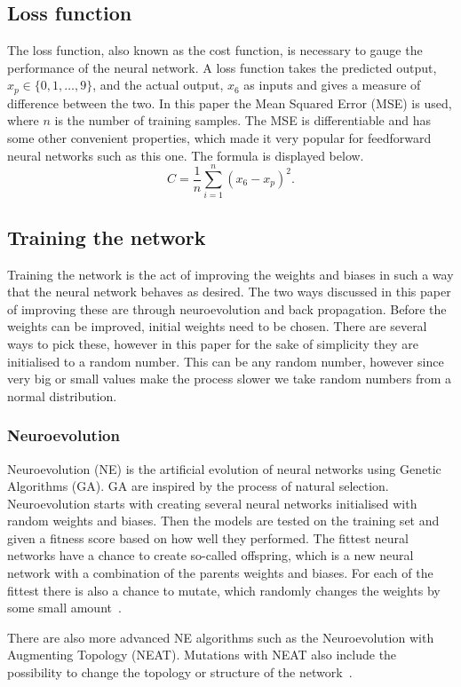 \subsection{Loss function}\label{s:loss}
The loss function, also known as the cost function, is necessary to gauge the performance of the neural network.
A loss function takes the predicted output, \(x_p\in \{0, 1, \ldots, 9\} \), and the actual output, \(x_6\) as inputs and gives a measure of difference between the two.
In this paper the Mean Squared Error (MSE) is used, where \(n\) is the number of training samples.
The MSE is differentiable and has some other convenient properties, which made it very popular for feedforward neural networks such as this one.
The formula is displayed below.
\[C = \frac{1}{n}\sum_{i = 1}^n {(x_6 - x_p)}^2.\]

\subsection{Training the network}\label{s:training}
Training the network is the act of improving the weights and biases in such a way that the neural network behaves as desired.
The two ways discussed in this paper of improving these are through neuroevolution and back propagation.
Before the weights can be improved, initial weights need to be chosen.
There are several ways to pick these, however in this paper for the sake of simplicity they are initialised to a random number.
This can be any random number, however since very big or small values make the process slower we take random numbers from a normal distribution.

\subsubsection{Neuroevolution}
Neuroevolution (NE) is the artificial evolution of neural networks using Genetic Algorithms (GA).
GA are inspired by the process of natural selection.
Neuroevolution starts with creating several neural networks initialised with random weights and biases.
Then the models are tested on the training set and given a fitness score based on how well they performed.
The fittest neural networks have a chance to create so-called offspring, which is a new neural network with a combination of the parents weights and biases.
For each of the fittest there is also a chance to mutate, which randomly changes the weights by some small amount~\cite{Whitley1993}.

There are also more advanced NE algorithms such as the Neuroevolution with Augmenting Topology (NEAT).
Mutations with NEAT also include the possibility to change the topology or structure of the network~\cite{Stanley2002}.

